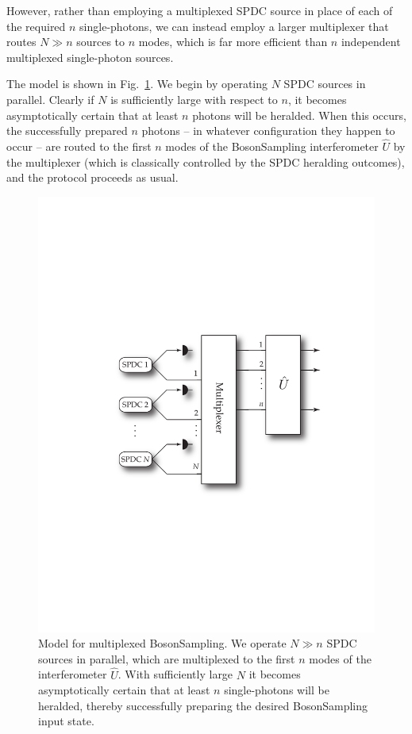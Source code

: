 \documentclass[aps, rmp, twocolumn, amsmath, amssymb, nofootinbib, superscriptaddress, longbibliography, floatfix, table-of-contents, eqsecnum]{revtex4-1}
\begin{document}
However, rather than employing a multiplexed SPDC source in place of each of the required $n$ single-photons, we can instead employ a larger multiplexer that routes \mbox{$N\gg n$} sources to $n$ modes, which is far more efficient than $n$ independent multiplexed single-photon sources.

The model is shown in Fig.~\ref{fig:multiplexed_bs}. We begin by operating $N$ SPDC sources in parallel. Clearly if $N$ is sufficiently large with respect to $n$, it becomes asymptotically certain that at least $n$ photons will be heralded. When this occurs, the successfully prepared $n$ photons -- in whatever configuration they happen to occur -- are routed to the first $n$ modes of the {\sc BosonSampling} interferometer $\hat{U}$ by the multiplexer (which is classically controlled by the SPDC heralding outcomes), and the protocol proceeds as usual.

\begin{figure}[!htb]
\includegraphics[width=\columnwidth]{multiplexed_boson_sampling}
\caption{Model for multiplexed {\sc BosonSampling}. We operate \mbox{$N\gg n$} SPDC sources in parallel, which are multiplexed to the first $n$ modes of the interferometer $\hat{U}$. With sufficiently large $N$ it becomes asymptotically certain that at least $n$ single-photons will be heralded, thereby successfully preparing the desired {\sc BosonSampling} input state.} \label{fig:multiplexed_bs}
\end{figure}
\end{document}
